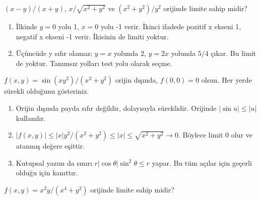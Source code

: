\begin{tcolorbox}[title={Örnek 4.12 | İki başka karşı örnek},colframe=accent]\((x-y)/(x+y)\), \(x/\sqrt{x^2+y^2}\) ve \((x^2+y^2)/y^2\) orijinde limite sahip midir?
\par{}\end{tcolorbox}
\begin{tcolorbox}[title={Adım adım çözüm},colback=green!3!white,colframe=green]\begin{enumerate}
\item İlkinde \(y=0\) yolu 1, \(x=0\) yolu -1 verir. İkinci ifadede pozitif x ekseni 1, negatif x ekseni -1 verir. İkisinin de limiti yoktur.
\item Üçüncüde y sıfır olamaz; \(y=x\) yolunda 2, \(y=2x\) yolunda \(5/4\) çıkar. Bu limit de yoktur. Tanımsız yolları test yolu olarak seçme.
\end{enumerate}\end{tcolorbox}
\begin{tcolorbox}[title={Örnek 4.13 | Dersteki parçalı fonksiyonun sürekliliği},colframe=accent]\(f(x,y)=\sin(xy^2)/(x^2+y^2)\) orijin dışında, \(f(0,0)=0\) olsun. Her yerde sürekli olduğunu gösteriniz.
\par{}\end{tcolorbox}
\begin{tcolorbox}[title={Adım adım çözüm},colback=green!3!white,colframe=green]\begin{enumerate}
\item Orijin dışında payda sıfır değildir, dolayısıyla süreklidir. Orijinde \(|\sin u|\le|u|\) kullanılır.
\item \(|f(x,y)|\le |x|y^2/(x^2+y^2)\le|x|\le\sqrt{x^2+y^2}\to0\). Böylece limit 0 olur ve atanmış değere eşittir.
\item Kutupsal yazım da sınırı \(r|\cos\theta|\sin^2\theta\le r\) yapar. Bu tüm açılar için geçerli olduğu için kanıttır.
\end{enumerate}\end{tcolorbox}
\begin{tcolorbox}[title={Örnek 4.14 | Bütün doğruların aynı sonucu vermesi yetmez},colframe=accent]\(f(x,y)=x^2y/(x^4+y^2)\) orijinde limite sahip midir?
\par\vspace{1mm}{\scriptsize\sffamily Pekiştirme}\end{tcolorbox}
